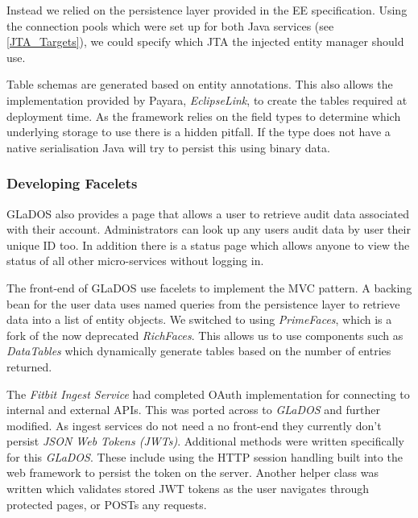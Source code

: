\par
Instead we relied on the persistence layer provided in the EE specification. Using the connection pools which were set up for both Java services (see \ref{JTA_Targets}), we could specify which JTA the injected entity manager should use.

\par
Table schemas are generated based on entity annotations. This also allows the implementation provided by Payara, \textit{EclipseLink}, to create the tables required at deployment time. As the framework relies on the field types to determine which underlying storage to use there is a hidden pitfall. If the type does not have a native serialisation Java will try to persist this using binary data.

\subsubsection{Developing Facelets}
\par
GLaDOS also provides a page that allows a user to retrieve audit data associated with their account. Administrators can look up any users audit data by user their unique ID too. In addition there is a status page which allows anyone to view the status of all other micro-services without logging in.

\par
The front-end of GLaDOS use facelets to implement the MVC pattern. A backing bean for the user data uses named queries from the persistence layer to retrieve data into a list of entity objects. We switched to using \textit{PrimeFaces}\cite{Primefaces}, which is a fork of the now deprecated \textit{RichFaces}. This allows us to use components such as \textit{DataTables} which dynamically generate tables based on the number of entries returned.

\par
The \textit{Fitbit Ingest Service} had completed OAuth implementation for connecting to internal and external APIs. This was ported across to \textit{GLaDOS} and further modified. As ingest services do not need a no front-end they currently don't persist \textit{JSON Web Tokens (JWTs)}. Additional methods were written specifically for this \textit{GLaDOS}. These include using the HTTP session handling built into the web framework to persist the token on the server. Another helper class was written which validates stored JWT tokens as the user navigates through protected pages, or POSTs any requests.

